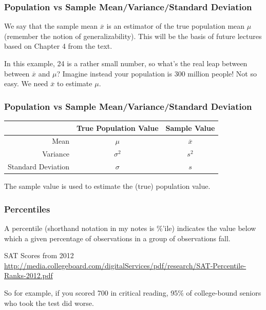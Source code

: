 \documentclass[handout]{beamer}
\newcommand{\blue}[1]{\textcolor{blue2}{#1}}
\begin{document}
\begin{frame}[fragile]
\frametitle{Population vs Sample Mean/Variance/Standard Deviation}

We say that the sample mean $\overline{x}$ is an \blue{estimator} of the \blue{true} population mean $\mu$ (remember the notion of \blue{generalizability}).  This will be the basis of future lectures based on Chapter 4 from the text.  

\vspace{0.5cm}

\pause In this example, 24 is a rather small number, so what's the real leap between between $\overline{x}$ and $\mu$?  Imagine instead your population is 300 million people!  Not so easy.  We need $\overline{x}$ to \blue{estimate} $\mu$.
\end{frame}


\begin{frame}[fragile]
\frametitle{Population vs Sample Mean/Variance/Standard Deviation}

\begin{center}
  \begin{tabular}{r|cc}
	\hline	
     & True Population Value & Sample Value \\ 
	\hline	
    Mean & $\mu$ & $\overline{x}$ \\ 
    Variance & $\sigma^2$ & $s^2$ \\ 
    Standard Deviation & $\sigma$ & $s$ \\ 
	\hline	
  \end{tabular}
\end{center}

\pause The sample value is used to \blue{estimate} the (true) population value.  

\end{frame}



\begin{frame}
\frametitle{Percentiles}
A percentile (shorthand notation in my notes is \%'ile) indicates the value below which a given percentage of observations in a group of observations fall.  

\vspace{0.5cm}

\pause SAT Scores from 2012 \blue{\url{http://media.collegeboard.com/digitalServices/pdf/research/SAT-Percentile-Ranks-2012.pdf}}

\vspace{0.5cm}

\pause So for example, if you scored 700 in critical reading, 95\% of college-bound seniors who took the test did worse.

\end{frame}
\end{document}
